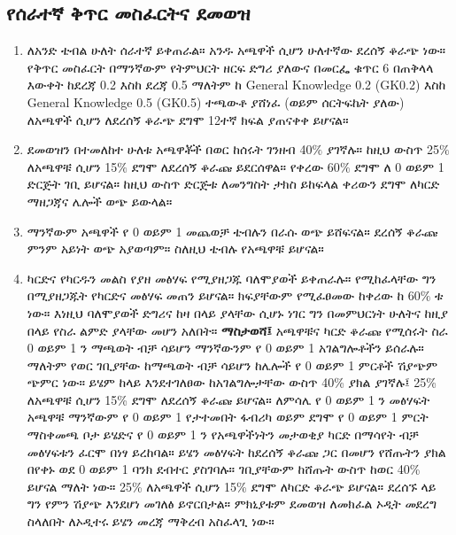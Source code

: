 \documentclass[a4paper,12pt]{article}
\newenvironment{geez}{\geezfont}{}
\begin{document}
\subsection{\begin{geez}የሰራተኛ ቅጥር መስፈርትና ደመወዝ\end{geez}}
\begin{enumerate}
\item ለአንድ ቴብል ሁለት ሰራተኛ ይቀጠራል። አንዱ አጫዋች ሲሆን ሁለተኛው ደረሰኝ ቆራጭ ነው። የቅጥር መስፈርት በማንኛውም የትምህርት ዘርፍ ድግሪ ያለውና በመርፌ ቁጥር 6 በጠቅላላ እውቀት ከደረጃ 0.2 እስከ ደረጃ 0.5 ማለትም ከ General Knowledge 0.2 (GK0.2) እስከ  General Knowledge 0.5 (GK0.5) ተጫውቶ ያሸነፈ (ወይም ሰርትፍኬት ያለው) ለአጫዋች ሲሆን ለደረሰኝ ቆራጭ ደግሞ 12ተኛ ክፍል ያጠናቀቀ ይሆናል።
\item ደመወዝን በተመለከተ ሁለቱ አጫዋቾች በወር ከሰሩት ገንዘብ 40$\%$ ያገኛሉ። ከዚህ ውስጥ 25$\%$ ለአጫዋቹ ሲሆን 15$\%$ ደግሞ ለደረሰኝ ቆራጩ ይደርሰዋል። የቀረው 60$\%$ ደግሞ ለ 0 ወይም 1 ድርጅት ገቢ ይሆናል። ከዚህ ውስጥ ድርጅቱ ለመንግስት ታክስ ይከፍላል ቀሪውን ደግሞ ለካርድ ማዘጋጃና ሌሎች ወጭ ይውላል። 
\item ማንኛውም አጫዋች የ 0 ወይም 1 መጨወቻ ቴብሉን በራሱ ወጭ ይሸፍናል። ደረሰኝ ቆራጩ ምንም አይነት ወጭ አያወጣም። ስለዚህ ቴብሉ የአጫዋቹ ይሆናል።
\item ካርድና የካርዱን መልስ የያዘ መፅሃፍ የሚያዘጋጁ ባለሞያወች ይቀጠራሉ። የሚከፈላቸው ግን በሚያዘጋጁት የካርድና መፅሃፍ መጠን ይሆናል። ክፍያቸውም የሚፈፀመው ከቀሪው ከ 60$\%$ ቱ ነው። እነዚህ ባለሞያወች ድግሪና ከዛ በላይ ያላቸው ሲሆኑ ነገር ግን በመምህርነት ሁለትና ከዚያ በላይ የስራ ልምድ ያላቸው መሆን አለበት።
\justify
{\bf \color{red}\begin{geez}ማስታወሻ፤\end{geez}} አጫዋቹና ካርድ ቆራጩ የሚሰሩት ስራ 0 ወይም 1 ን ማጫወት ብቻ ሳይሆን ማንኛውንም የ 0 ወይም 1 አገልግሎቶችን ይሰራሉ። ማለትም የወር ገቢያቸው ከማጫወት ብቻ ሳይሆን ከሌሎች የ 0 ወይም 1 ምርቶች ሽያጭም ጭምር ነው። ይሄም ከላይ እንደተገለፀው ከአገልግሎታቸው ውስጥ 40\% ያክል ያገኛሉ፤ 25\% ለአጫዋቹ ሲሆን 15\% ደግሞ ለደረሰኝ ቆራጩ ይሆናል። ለምሳሌ የ 0 ወይም 1 ን መፅሃፍት አጫዋቹ ማንኛውም የ 0 ወይም 1 የታተመበት ፋብሪካ ወይም ደግሞ የ 0 ወይም 1 ምርት ማስቀመጫ ቦታ  ይሄድና የ 0 ወይም 1 ን የአጫዋችነትን መታወቂያ ካርድ በማሳየት ብቻ መፅሃፍቱን ፈርሞ በነፃ ይረከባል። ይሄን መፅሃፍት ከደረሰኝ ቆራጩ ጋር በመሆን የሸጡትን ያክል በየቀኑ ወደ 0 ወይም 1 ባንክ ደብተር  ያስገባሉ። ገቢያቸውም ከሸጡት ውስጥ ከወር 40\% ይሆናል ማለት ነው። 25\% ለአጫዋች ሲሆን 15\% ደግሞ ለካርድ ቆራጭ ይሆናል። ደረሰኙ ላይ ግን የምን ሽያጭ እንደሆነ መገለፅ ይኖርበታል። ምክኒያቱም  ደመወዝ ለመክፈል ኦዲት መደረግ ስላለበት ለኦዲተሩ ይሄን መረጃ ማቅረብ አስፈላጊ ነው። 
\end{enumerate} 
\end{document}
